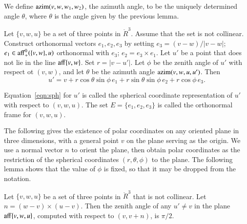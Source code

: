 \begin{definition}[azim] 
We define ${\operatorname{azim}}(v,w,w_1,w_2)$, the azimuth angle, 
to be the uniquely determined
angle $\theta$, where $\theta$ is the angle given by the previous
lemma.
\end{definition}

\begin{lemma}\label{lemma:sph}
Let $\{v,w,u\}$ be a set of three points in $\ring{R}^3$.
Assume that the set is not collinear.  
Construct orthonormal vectors  $e_1,e_2,e_3$ by setting
$e_3 = (v-w)/|v-w|$; 
$e_1\in{\operatorname{aff}}_+^0(\{v,w\},u)$ orthonormal with $e_3$;
$e_2 = e_3\times e_1$.
Let $u'$ be a point that does not
lie in the line ${\operatorname{aff}}\{v,w\}$.
Set $r = |v - u'|$. Let
$\phi$ be the zenith angle of $u'$ with respect ot $(v,w)$, and let
$\theta$ be the azimuth angle ${\operatorname{azim}}(v,w,u,u')$.  Then
   \begin{equation}
   u' = v + r \cos\theta \sin\phi\, e_1 + r \sin\theta\sin\phi\, e_2 +
   r\cos\phi\,e_3.
   \label{eqn:sph}
   \end{equation}
\end{lemma}

\begin{definition}[frame]\label{def:sph}
Equation~\ref{eqn:sph} for
$u'$ is called the spherical coordinate representation of
$u'$ with respect to $(v,w,u)$.  The set $E=\{e_1,e_2,e_3\}$ is called
the orthonormal frame for $(v,w,u)$.  
\end{definition}

The following gives the existence of polar coordinates on any oriented
plane in three dimensions, with a general point $v$ on the plane
serving as the origin.  We use a normal vector $n$ to orient the plane,
then obtain polar coordinates as the restriction of the
spherical coordinates $(r,\theta,\phi)$ to the plane.
The following lemma shows that the value of $\phi$ is fixed, so that
it may be dropped from the notation.

\begin{lemma}\label{lemma:polar-gen}
Let $\{v,w,u\}$ be a set of three points in $\ring{R}^3$
that is not collinear.
Let $n = (w-v) \times (u-v)$.
Then the zenith angle of any $u'\ne v$ in the plane ${\operatorname{aff}}\{v,w,u\}$,
computed with respect to $(v,v+n)$,
is $\pi/2$.
\end{lemma}

